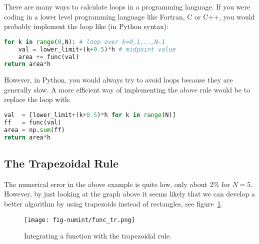 \documentclass[graybox,sectrefs,envcountresetchap,open=right,final]{svmonodo}
\newenvironment{graybox2admon}[1][]{
\begin{graybox2mdframed}[frametitle=#1]
}
{
\end{graybox2mdframed}
}
\begin{document}
\begin{graybox2admon}[Notice]
There are many ways to calculate loops in a programming language. If you were coding in a lower level programming language like Fortran, C or C++, you would probably implement the loop like (in Python syntax):
\begin{lstlisting}[language=Python,style=blue1]
for k in range(0,N): # loop over k=0,1,..,N-1
    val = lower_limit+(k+0.5)*h # midpoint value
    area += func(val)
return area*h
\end{lstlisting}
However, in Python, you would always try to avoid loops because they are generally slow. A more efficient way of implementing the above rule would be to replace the loop with:
\begin{lstlisting}[language=Python,style=blue1]
val  = [lower_limit+(k+0.5)*h for k in range(N)]
ff   = func(val)
area = np.sum(ff)
return area*h
\end{lstlisting}
\end{graybox2admon}





\subsection{The Trapezoidal Rule}
The numerical error in the above example is quite low, only about 2$\%$ for $N=5$. 
However, by just looking at the graph above it seems likely that we can develop a better algorithm by using trapezoids instead of rectangles, 
see figure~\ref{fig:numint:trap}.


\begin{figure}[!ht]  %
  \centerline{\texttt{[image: fig-numint/func\_tr.png]}}
  \caption{
  Integrating a function with the trapezoidal rule. \label{fig:numint:trap}
  }
\end{figure}
\end{document}
